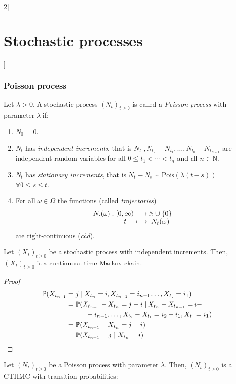 \documentclass[../../../main_math.tex]{subfiles}
\begin{document}
\begin{multicols}{2}[\section{Stochastic processes}]
  \subsubsection{Poisson process}
  \begin{definition}
    Let $\lambda>0$. A stochastic process ${(N_t)}_{t\geq 0}$ is called a \emph{Poisson process} with parameter $\lambda$ if:
    \begin{enumerate}
      \item $N_0=0$.
      \item $N_t$ has \emph{independent increments}, that is $N_{t_1}, N_{t_2}-N_{t_1},\ldots,N_{t_n}-N_{t_{n-1}}$ are independent random variables for all $0\leq t_1<\cdots<t_n$ and all $n\in\mathbb{N}$.
      \item $N_t$ has \emph{stationary increments}, that is $N_t-N_s\sim\text{Pois}(\lambda(t-s))$ $\forall 0\leq s\leq t$.
      \item For all $\omega\in\Omega$ the functions (called \emph{trajectories})
            $$
              \function{N_\cdot(\omega)}{[0,\infty)}{\NN\cup\{0\}}{t}{N_t(\omega)}
            $$
            are right-continuous (\emph{càd}).
    \end{enumerate}
  \end{definition}
  \begin{proposition}
    Let ${(X_t)}_{t\geq 0}$ be a stochastic process with independent increments. Then, ${(X_t)}_{t\geq 0}$ is a continuous-time Markov chain.
  \end{proposition}
  \begin{proof}
    \begin{align*}
      \mathbb{P}(X_{t_{n+1}} & =  j\mid X_{t_n}=i, X_{t_{n-1}}=i_{n-1}\ldots,X_{t_1}=i_1)       \\
                        & =\mathbb{P}(X_{t_{n+1}}-X_{t_n}=j-i\mid X_{t_n}-X_{t_{n-1}}=i-        \\
                        & \hspace{1cm}-i_{n-1},\ldots,X_{t_2}-X_{t_1}=i_2-i_1,X_{t_1}=i_1) \\
                        & =\mathbb{P}(X_{t_{n+1}}-X_{t_n}=j-i)                                  \\
                        & =\mathbb{P}(X_{t_{n+1}}=j\mid X_{t_n}=i)
    \end{align*}
  \end{proof}
  \begin{corollary}
    Let ${(N_t)}_{t\geq 0}$ be a Poisson process with parameter $\lambda$. Then, ${(N_t)}_{t\geq 0}$ is a CTHMC with transition probabilities:

\end{corollary}
\end{multicols}
\end{document}
